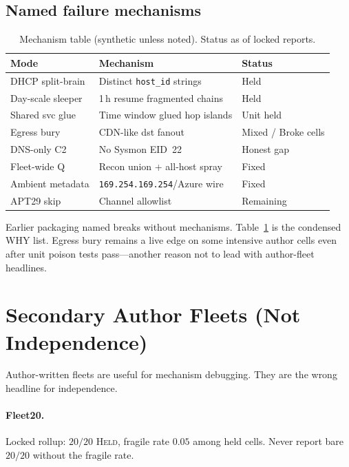 \documentclass[conference,compsoc]{IEEEtran}
\begin{document}
\subsection{Named failure mechanisms}
\label{sec:failures}

\begin{table}[!t]
\caption{Mechanism table (synthetic unless noted). Status as of locked reports.}
\label{tab:fail}
\centering
\scriptsize
\begin{tabular}{@{}p{0.95in}p{1.55in}p{0.7in}@{}}
\toprule
Mode & Mechanism & Status \\
\midrule
DHCP split-brain & Distinct \texttt{host\_id} strings & Held \\
Day-scale sleeper & 1\,h resume fragmented chains & Held \\
Shared svc glue & Time window glued hop islands & Unit held \\
Egress bury & CDN-like dst fanout & Mixed / Broke cells \\
DNS-only C2 & No Sysmon EID~22 & Honest gap \\
Fleet-wide Q & Recon union + all-host spray & Fixed \\
Ambient metadata & \texttt{169.254.169.254}/Azure wire & Fixed \\
APT29 skip & Channel allowlist & Remaining \\
\bottomrule
\end{tabular}
\end{table}

Earlier packaging named breaks without mechanisms.
Table~\ref{tab:fail} is the condensed WHY list.
Egress bury remains a live edge on some intensive author cells even after unit
poison tests pass---another reason not to lead with author-fleet headlines.

\section{Secondary Author Fleets (Not Independence)}
\label{sec:secondary}

Author-written fleets are useful for mechanism debugging.
They are the wrong headline for independence.

\paragraph{Fleet20.}
Locked rollup: $20/20$ \textsc{Held}, fragile rate $0.05$ among held cells.
Never report bare $20/20$ without the fragile rate.
\end{document}

